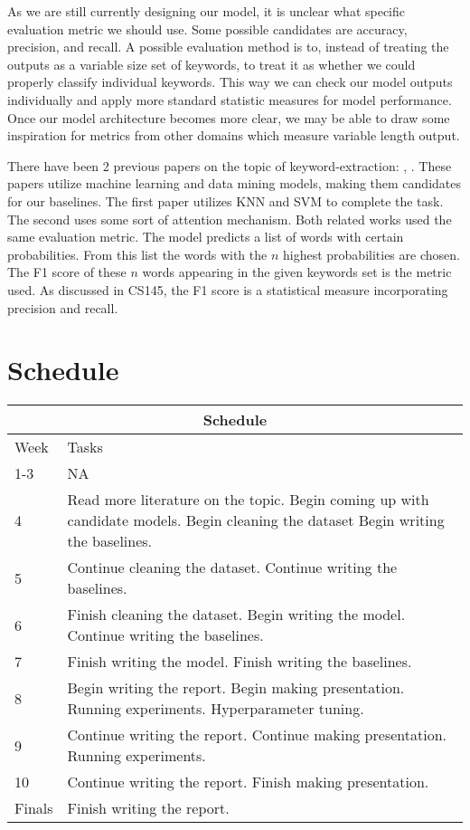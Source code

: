 \documentclass[sigconf,nonacm=True,10pt]{acmart}
\begin{document}
As we are still currently designing our model, it is unclear what specific evaluation metric we should use. Some possible candidates are accuracy, precision, and recall. A possible evaluation method is to, instead of treating the outputs as a variable size set of keywords, to treat it as whether we could properly classify individual keywords. This way we can check our model outputs individually and apply more standard statistic measures for model performance. Once our model architecture becomes more clear, we may be able to draw some inspiration for metrics from other domains which measure variable length output.

There have been 2 previous papers on the topic of keyword-extraction: \cite{DBLP:journals/corr/MengZHHBC17}, \cite{hong2013keyword}. These papers utilize machine learning and data mining models, making them candidates for our baselines. The first paper utilizes KNN and SVM to complete the task. The second uses some sort of attention mechanism. Both related works used the same evaluation metric. The model predicts a list of words with certain probabilities. From this list the words with the $n$ highest probabilities are chosen. The F1 score of these $n$ words appearing in the given keywords set is the metric used. As discussed in CS145, the F1 score is a statistical measure incorporating precision and recall.

\section{Schedule}

\begin{tabular}{ |p{1cm}||p{6.5cm}| }
	\hline
	\multicolumn{2}{|c|}{Schedule} \\
	\hline
	Week   & Tasks \\
	\hline
	1-3   & N\/A \\
	\hline
	4 &  Read more literature on the topic. 
	Begin coming up with candidate models. Begin cleaning the dataset
	Begin writing the baselines.
	 \\
	\hline
	5& Continue cleaning the dataset.
	Continue writing the baselines.
	 \\
	\hline
	6&  Finish cleaning the dataset.
	Begin writing the model.
	Continue writing the baselines.
	\\
	\hline
	7&  Finish writing the model.
	Finish writing the baselines.
	\\
	\hline
	8&  Begin writing the report.
	Begin making presentation.
	Running experiments.
	Hyperparameter tuning.
	\\
	\hline
	9&  Continue writing the report.
	Continue making presentation.
	Running experiments.
	\\
	\hline
	10&  Continue writing the report.
	Finish making presentation.
	\\
	\hline
	Finals &  Finish writing the report.\\
	\hline
\end{tabular}



\end{document}
